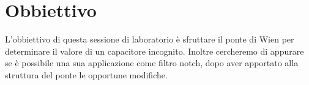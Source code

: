 \section*{Obbiettivo}

L'obbiettivo di questa sessione di laboratorio è sfruttare il ponte di Wien per determinare il valore di un capacitore incognito.
Inoltre cercheremo di appurare se è possibile una sua applicazione come filtro notch, dopo aver apportato alla struttura del ponte le opportune modifiche.
